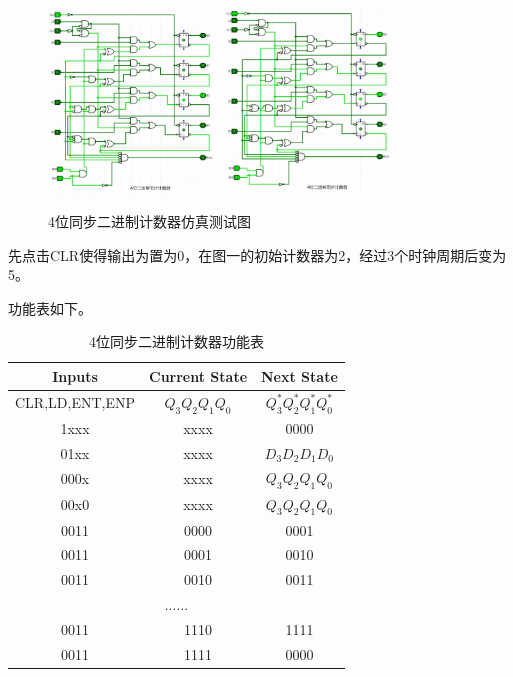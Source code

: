 \documentclass{article}
\begin{document}
    \begin{figure}[H]
    \centering
    \includegraphics[width=0.4\textwidth]{1.5.3.png}  
    \includegraphics[width=0.4\textwidth]{1.5.4.png}
    \caption{4位同步二进制计数器仿真测试图}
    \end{figure}
    先点击CLR使得输出为置为0，在图一的初始计数器为2，经过3个时钟周期后变为5。
    
    功能表如下。
    
    \begin{table}[H]
    \centering
    \begin{tabular}{|c|c|c|}
        \hline
        Inputs & Current State & Next State \\ \hline
        CLR,LD,ENT,ENP & $Q_{3}Q_{2}Q_{1}Q_{0}$ & $Q_{3}^{*}Q_{2}^{*}Q_{1}^{*}Q_{0}^{*}$ \\ \hline
        1xxx & xxxx & 0000 \\ \hline
        01xx & xxxx & $D_{3}D_{2}D_{1}D_{0}$ \\ \hline
        000x & xxxx & $Q_{3}Q_{2}Q_{1}Q_{0}$ \\ \hline
        00x0 & xxxx & $Q_{3}Q_{2}Q_{1}Q_{0}$ \\ \hline
        0011 & 0000 & 0001 \\ \hline
        0011 & 0001 & 0010 \\ \hline
        0011 & 0010 & 0011 \\ \hline
        \multicolumn{3}{|c|}{......} \\ \hline
        0011 & 1110 & 1111 \\ \hline
        0011 & 1111 & 0000 \\ \hline
    \end{tabular}
    \caption{4位同步二进制计数器功能表}
    \end{table}
\end{document}
